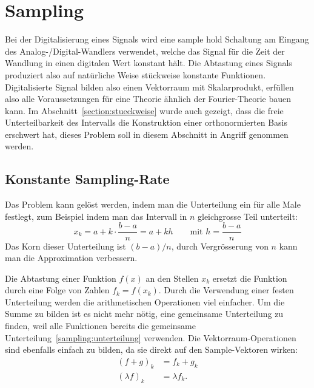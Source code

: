 %
%
%
\section{Sampling%
\label{section:sampling}}
Bei der Digitalisierung eines Signals wird eine sample hold Schaltung am
Eingang des Analog-/Digital-Wandlers verwendet, welche das Signal für die
Zeit der Wandlung in einen digitalen Wert konstant hält.
Die Abtastung eines Signals produziert also auf natürliche Weise
stückweise konstante Funktionen.
Digitalisierte Signal bilden also einen Vektorraum mit Skalarprodukt,
erfüllen also alle Voraussetzungen für eine Theorie ähnlich der Fourier-Theorie
bauen kann.
Im Abschnitt~\ref{section:stueckweise} wurde auch gezeigt, dass die freie
Unterteilbarkeit des Intervalls die Konstruktion einer orthonormierten Basis
erschwert hat, dieses Problem soll in diesem Abschnitt in Angriff genommen
werden.

\subsection{Konstante Sampling-Rate}
Das Problem kann gelöst werden, indem man die Unterteilung ein für alle
Male festlegt, zum Beispiel indem man das Intervall in $n$ gleichgrosse
Teil unterteilt:
\begin{equation}
x_k = a + k\cdot\frac{b-a}{n} = a + kh
\qquad
\text{mit $\displaystyle h=\frac{b-a}n$}
\label{sampling:unterteilung}
\end{equation}
Das Korn dieser Unterteilung ist $(b-a)/n$, durch Vergrösserung von $n$
kann man die Approximation verbessern.

Die Abtastung einer Funktion $f(x)$ an den Stellen $x_k$ ersetzt
die Funktion durch eine Folge von Zahlen $f_k = f(x_k)$.
Durch die Verwendung einer festen Unterteilung werden die arithmetischen
Operationen viel einfacher.
Um die Summe zu bilden ist es nicht mehr nötig, eine gemeinsame
Unterteilung zu finden, weil alle Funktionen bereits die gemeinsame
Unterteilung~\eqref{sampling:unterteilung} verwenden.
Die Vektorraum-Operationen sind ebenfalls einfach zu bilden,
da sie direkt auf den Sample-Vektoren wirken:
\begin{align*}
(f+g)_k &= f_k + g_k \\
(\lambda f)_k &= \lambda f_k.
\end{align*}

